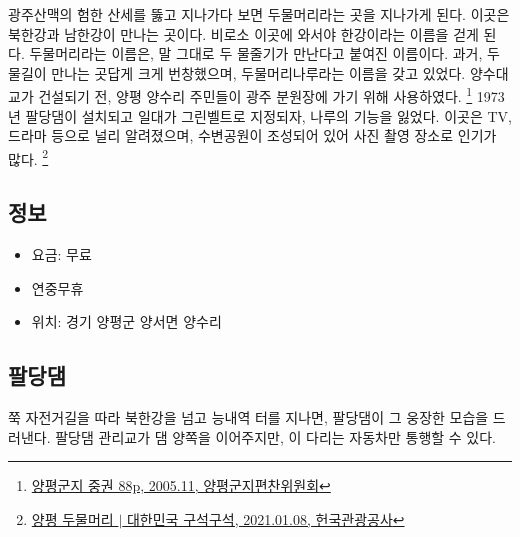 광주산맥의 험한 산세를 뚫고 지나가다 보면 두물머리라는 곳을 지나가게 된다. 이곳은 북한강과 남한강이 만나는 곳이다.
비로소 이곳에 와서야 한강이라는 이름을 걷게 된다.
두물머리라는 이름은, 말 그대로 두 물줄기가 만난다고 붙여진 이름이다.
과거, 두 물길이 만나는 곳답게 크게 번창했으며, 두물머리나루라는 이름을 갖고 있었다.
양수대교가 건설되기 전, 양평 양수리 주민들이 광주 분원장에 가기 위해 사용하였다.
\footnote{\href{https://memory.library.kr/files/original/d0e1ac861462002dbd83441d0c6e38e6.pdf}{양평군지 중권 88p, 2005.11, 양평군지편찬위원회}}
1973년 팔당댐이 설치되고 일대가 그린벨트로 지정되자,
나루의 기능을 잃었다.
이곳은 TV, 드라마 등으로 널리 알려졌으며,
수변공원이 조성되어 있어 사진 촬영 장소로 인기가 많다.
\footnote{\href{https://terms.naver.com/entry.naver?docId=1997444&cid=42856&categoryId=42856}{양평 두물머리 $|$ 대한민국 구석구석, 2021.01.08, 헌국관광공사}}

\subsection{정보}
\begin{itemize}
    \item 요금: 무료
    \item 연중무휴
    \item 위치: 경기 양평군 양서면 양수리
\end{itemize}


\subsection{팔당댐}
쭉 자전거길을 따라 북한강을 넘고 능내역 터를 지나면, 팔당댐이 그 웅장한 모습을 드러낸다. 
팔당댐 관리교가 댐 양쪽을 이어주지만, 이 다리는 자동차만 통행할 수 있다.


